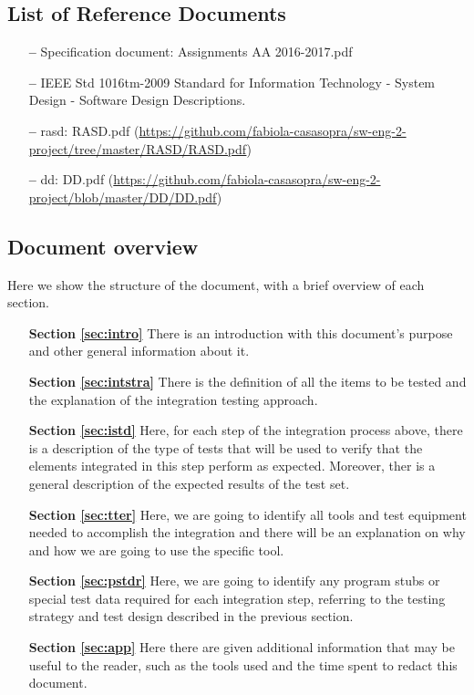 \subsection{List of Reference Documents}

\begin{itemize}
\item[\textbf{--}] Specification document: Assignments AA 2016-2017.pdf
\item[\textbf{--}] IEEE Std 1016tm-2009 Standard for Information Technology - System Design - Software Design Descriptions.
\item[\textbf{--}] \acl{rasd}: RASD.pdf 
\newline
(\url{https://github.com/fabiola-casasopra/sw-eng-2-project/tree/master/RASD/RASD.pdf})
\item[\textbf{--}] \acl{dd}: DD.pdf 
\newline
(\url{https://github.com/fabiola-casasopra/sw-eng-2-project/blob/master/DD/DD.pdf})
\end{itemize}

\subsection{Document overview}

Here we show the structure of the document, with a brief overview of each section.

\begin{itemize}

\item[\textbf{Section \ref{sec:intro}}]There is an introduction with this document's purpose and other general information about it.

\item[\textbf{Section \ref{sec:intstra}}]There is the definition of all the items to be tested and the explanation of the integration testing approach.

\item[\textbf{Section \ref{sec:istd}}]Here, for each step of the integration process above, there is a description of the type of tests that will be used to verify that the elements integrated in this step perform as expected. Moreover, ther is a general description of the expected results of the test set.  

\item[\textbf{Section \ref{sec:tter}}]Here, we are going to identify all tools and test equipment needed to accomplish the integration and there will be an explanation on why and how we are going to use the specific tool. 

\item[\textbf{Section \ref{sec:pstdr}}]Here, we are going to identify any program stubs or special test data required for each integration step, referring to the testing strategy and test design described in the previous section.

\item[\textbf{Section \ref{sec:app}}]Here there are given additional information that may be useful to the reader, such as the tools used and the time spent to redact this document.
\end{itemize}